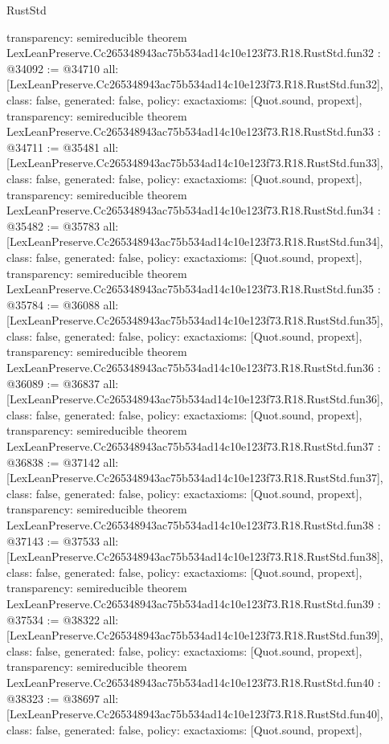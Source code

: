 \begin{lexlean}{RustStd}
\begin{coremodule}
{  transparency: semireducible
}
theorem LexLeanPreserve.Cc265348943ac75b534ad14c10e123f73.R18.RustStd.fun32 : @34092 := @34710 {
  all: [LexLeanPreserve.Cc265348943ac75b534ad14c10e123f73.R18.RustStd.fun32],
  class: false,
  generated: false,
  policy: exact{axioms: [Quot.sound, propext]},
  transparency: semireducible
}
theorem LexLeanPreserve.Cc265348943ac75b534ad14c10e123f73.R18.RustStd.fun33 : @34711 := @35481 {
  all: [LexLeanPreserve.Cc265348943ac75b534ad14c10e123f73.R18.RustStd.fun33],
  class: false,
  generated: false,
  policy: exact{axioms: [Quot.sound, propext]},
  transparency: semireducible
}
theorem LexLeanPreserve.Cc265348943ac75b534ad14c10e123f73.R18.RustStd.fun34 : @35482 := @35783 {
  all: [LexLeanPreserve.Cc265348943ac75b534ad14c10e123f73.R18.RustStd.fun34],
  class: false,
  generated: false,
  policy: exact{axioms: [Quot.sound, propext]},
  transparency: semireducible
}
theorem LexLeanPreserve.Cc265348943ac75b534ad14c10e123f73.R18.RustStd.fun35 : @35784 := @36088 {
  all: [LexLeanPreserve.Cc265348943ac75b534ad14c10e123f73.R18.RustStd.fun35],
  class: false,
  generated: false,
  policy: exact{axioms: [Quot.sound, propext]},
  transparency: semireducible
}
theorem LexLeanPreserve.Cc265348943ac75b534ad14c10e123f73.R18.RustStd.fun36 : @36089 := @36837 {
  all: [LexLeanPreserve.Cc265348943ac75b534ad14c10e123f73.R18.RustStd.fun36],
  class: false,
  generated: false,
  policy: exact{axioms: [Quot.sound, propext]},
  transparency: semireducible
}
theorem LexLeanPreserve.Cc265348943ac75b534ad14c10e123f73.R18.RustStd.fun37 : @36838 := @37142 {
  all: [LexLeanPreserve.Cc265348943ac75b534ad14c10e123f73.R18.RustStd.fun37],
  class: false,
  generated: false,
  policy: exact{axioms: [Quot.sound, propext]},
  transparency: semireducible
}
theorem LexLeanPreserve.Cc265348943ac75b534ad14c10e123f73.R18.RustStd.fun38 : @37143 := @37533 {
  all: [LexLeanPreserve.Cc265348943ac75b534ad14c10e123f73.R18.RustStd.fun38],
  class: false,
  generated: false,
  policy: exact{axioms: [Quot.sound, propext]},
  transparency: semireducible
}
theorem LexLeanPreserve.Cc265348943ac75b534ad14c10e123f73.R18.RustStd.fun39 : @37534 := @38322 {
  all: [LexLeanPreserve.Cc265348943ac75b534ad14c10e123f73.R18.RustStd.fun39],
  class: false,
  generated: false,
  policy: exact{axioms: [Quot.sound, propext]},
  transparency: semireducible
}
theorem LexLeanPreserve.Cc265348943ac75b534ad14c10e123f73.R18.RustStd.fun40 : @38323 := @38697 {
  all: [LexLeanPreserve.Cc265348943ac75b534ad14c10e123f73.R18.RustStd.fun40],
  class: false,
  generated: false,
  policy: exact{axioms: [Quot.sound, propext]},
}
\end{coremodule}
\end{lexlean}
